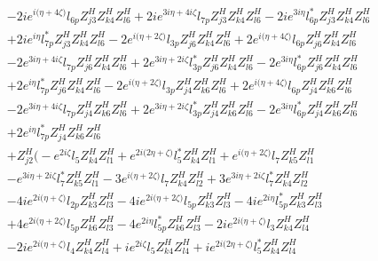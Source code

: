 \begin{align}
 &-2 i e^{i \Big(\eta +4 \zeta \Big)} l_{6p} Z_{{j 3}}^{H} Z_{{k 4}}^{H} Z_{{l 6}}^{H} +2 i e^{3 i \eta +4 i \zeta } l_{7p} Z_{{j 3}}^{H} Z_{{k 4}}^{H} Z_{{l 6}}^{H} -2 i e^{3 i \eta } l_{6p}^* Z_{{j 3}}^{H} Z_{{k 4}}^{H} Z_{{l 6}}^{H} \nonumber \\ 
 &+2 i e^{i \eta } l_{7p}^* Z_{{j 3}}^{H} Z_{{k 4}}^{H} Z_{{l 6}}^{H} -2 e^{i \Big(\eta +2 \zeta \Big)} l_{3p} Z_{{j 6}}^{H} Z_{{k 4}}^{H} Z_{{l 6}}^{H} +2 e^{i \Big(\eta +4 \zeta \Big)} l_{6p} Z_{{j 6}}^{H} Z_{{k 4}}^{H} Z_{{l 6}}^{H} \nonumber \\ 
 &-2 e^{3 i \eta +4 i \zeta } l_{7p} Z_{{j 6}}^{H} Z_{{k 4}}^{H} Z_{{l 6}}^{H} +2 e^{3 i \eta +2 i \zeta } l_{3p}^* Z_{{j 6}}^{H} Z_{{k 4}}^{H} Z_{{l 6}}^{H} -2 e^{3 i \eta } l_{6p}^* Z_{{j 6}}^{H} Z_{{k 4}}^{H} Z_{{l 6}}^{H} \nonumber \\ 
 &+2 e^{i \eta } l_{7p}^* Z_{{j 6}}^{H} Z_{{k 4}}^{H} Z_{{l 6}}^{H} -2 e^{i \Big(\eta +2 \zeta \Big)} l_{3p} Z_{{j 4}}^{H} Z_{{k 6}}^{H} Z_{{l 6}}^{H} +2 e^{i \Big(\eta +4 \zeta \Big)} l_{6p} Z_{{j 4}}^{H} Z_{{k 6}}^{H} Z_{{l 6}}^{H} \nonumber \\ 
 &-2 e^{3 i \eta +4 i \zeta } l_{7p} Z_{{j 4}}^{H} Z_{{k 6}}^{H} Z_{{l 6}}^{H} +2 e^{3 i \eta +2 i \zeta } l_{3p}^* Z_{{j 4}}^{H} Z_{{k 6}}^{H} Z_{{l 6}}^{H} -2 e^{3 i \eta } l_{6p}^* Z_{{j 4}}^{H} Z_{{k 6}}^{H} Z_{{l 6}}^{H} \nonumber \\ 
 &+2 e^{i \eta } l_{7p}^* Z_{{j 4}}^{H} Z_{{k 6}}^{H} Z_{{l 6}}^{H} \nonumber \\ 
 &+Z_{{j 2}}^{H} \Big(- e^{2 i \zeta } l_5 Z_{{k 4}}^{H} Z_{{l 1}}^{H} +e^{2 i \Big(2 \eta +\zeta \Big)} l_5^* Z_{{k 4}}^{H} Z_{{l 1}}^{H} +e^{i \Big(\eta +2 \zeta \Big)} l_7 Z_{{k 5}}^{H} Z_{{l 1}}^{H} \nonumber \\ 
 &- e^{3 i \eta +2 i \zeta } l_7^* Z_{{k 5}}^{H} Z_{{l 1}}^{H} -3 e^{i \Big(\eta +2 \zeta \Big)} l_7 Z_{{k 4}}^{H} Z_{{l 2}}^{H} +3 e^{3 i \eta +2 i \zeta } l_7^* Z_{{k 4}}^{H} Z_{{l 2}}^{H} \nonumber \\ 
 &-4 i e^{2 i \Big(\eta +\zeta \Big)} l_{2p} Z_{{k 3}}^{H} Z_{{l 3}}^{H} -4 i e^{2 i \Big(\eta +2 \zeta \Big)} l_{5p} Z_{{k 3}}^{H} Z_{{l 3}}^{H} -4 i e^{2 i \eta } l_{5p}^* Z_{{k 3}}^{H} Z_{{l 3}}^{H} \nonumber \\ 
 &+4 e^{2 i \Big(\eta +2 \zeta \Big)} l_{5p} Z_{{k 6}}^{H} Z_{{l 3}}^{H} -4 e^{2 i \eta } l_{5p}^* Z_{{k 6}}^{H} Z_{{l 3}}^{H} -2 i e^{2 i \Big(\eta +\zeta \Big)} l_3 Z_{{k 4}}^{H} Z_{{l 4}}^{H} \nonumber \\ 
 &-2 i e^{2 i \Big(\eta +\zeta \Big)} l_4 Z_{{k 4}}^{H} Z_{{l 4}}^{H} +i e^{2 i \zeta } l_5 Z_{{k 4}}^{H} Z_{{l 4}}^{H} +i e^{2 i \Big(2 \eta +\zeta \Big)} l_5^* Z_{{k 4}}^{H} Z_{{l 4}}^{H} \nonumber \\ 

\end{align}
